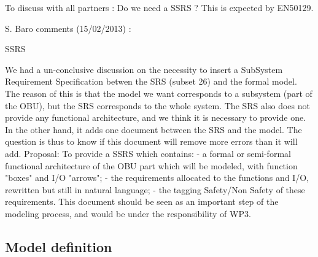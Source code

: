 \begin{issue}
To discuss with all partners :  Do we need a SSRS ? This is expected by EN50129.

S. Baro comments (15/02/2013) :

SSRS

We had a un-conclusive discussion on the necessity to insert a SubSystem Requirement Specification betwen the SRS (subset 26) and the formal model. The reason of this is that the model we want corresponds to a subsystem (part of the OBU), but the SRS corresponds to the whole system. The SRS also does not provide any functional architecture, and we think it is necessary to provide one. In the other hand, it adds one document between the SRS and the model. The question is thus to know if this document will remove more errors than it will add.
Proposal: To provide a SSRS which contains:
- a formal or semi-formal functional architecture of the OBU part which will be modeled, with function "boxes" and I/O "arrows";
- the requirements allocated to the functions and I/O, rewritten but still in natural language;
- the tagging Safety/Non Safety of these requirements.
This document should be seen as an important step of the modeling process, and would be under the responsibility of WP3.
 

\end{issue}

\subsection{Model definition}


\begin{comment} Some requirements to take into account :
\end{comment}





